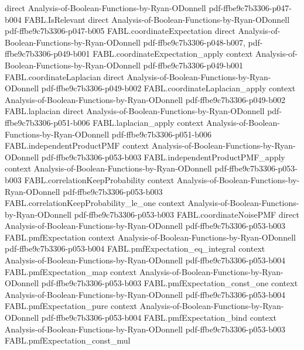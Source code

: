 \begin{theorem}
  {direct}
  {Analysis-of-Boolean-Functions-by-Ryan-ODonnell}
  {pdf-ffbe9c7b3306-p047-b004}
\proofstep
  {FABL.IsRelevant}
  {direct}
  {Analysis-of-Boolean-Functions-by-Ryan-ODonnell}
  {pdf-ffbe9c7b3306-p047-b005}
\proofstep
  {FABL.coordinateExpectation}
  {direct}
  {Analysis-of-Boolean-Functions-by-Ryan-ODonnell}
  {pdf-ffbe9c7b3306-p048-b007,
    pdf-ffbe9c7b3306-p049-b001}
\proofstep
  {FABL.coordinateExpectation_apply}
  {context}
  {Analysis-of-Boolean-Functions-by-Ryan-ODonnell}
  {pdf-ffbe9c7b3306-p049-b001}
\proofstep
  {FABL.coordinateLaplacian}
  {direct}
  {Analysis-of-Boolean-Functions-by-Ryan-ODonnell}
  {pdf-ffbe9c7b3306-p049-b002}
\proofstep
  {FABL.coordinateLaplacian_apply}
  {context}
  {Analysis-of-Boolean-Functions-by-Ryan-ODonnell}
  {pdf-ffbe9c7b3306-p049-b002}
\proofstep
  {FABL.laplacian}
  {direct}
  {Analysis-of-Boolean-Functions-by-Ryan-ODonnell}
  {pdf-ffbe9c7b3306-p051-b006}
\proofstep
  {FABL.laplacian_apply}
  {context}
  {Analysis-of-Boolean-Functions-by-Ryan-ODonnell}
  {pdf-ffbe9c7b3306-p051-b006}
\proofstep
  {FABL.independentProductPMF}
  {context}
  {Analysis-of-Boolean-Functions-by-Ryan-ODonnell}
  {pdf-ffbe9c7b3306-p053-b003}
\proofstep
  {FABL.independentProductPMF_apply}
  {context}
  {Analysis-of-Boolean-Functions-by-Ryan-ODonnell}
  {pdf-ffbe9c7b3306-p053-b003}
\proofstep
  {FABL.correlationKeepProbability}
  {context}
  {Analysis-of-Boolean-Functions-by-Ryan-ODonnell}
  {pdf-ffbe9c7b3306-p053-b003}
\proofstep
  {FABL.correlationKeepProbability_le_one}
  {context}
  {Analysis-of-Boolean-Functions-by-Ryan-ODonnell}
  {pdf-ffbe9c7b3306-p053-b003}
\proofstep
  {FABL.coordinateNoisePMF}
  {direct}
  {Analysis-of-Boolean-Functions-by-Ryan-ODonnell}
  {pdf-ffbe9c7b3306-p053-b003}
\proofstep
  {FABL.pmfExpectation}
  {context}
  {Analysis-of-Boolean-Functions-by-Ryan-ODonnell}
  {pdf-ffbe9c7b3306-p053-b004}
\proofstep
  {FABL.pmfExpectation_eq_integral}
  {context}
  {Analysis-of-Boolean-Functions-by-Ryan-ODonnell}
  {pdf-ffbe9c7b3306-p053-b004}
\proofstep
  {FABL.pmfExpectation_map}
  {context}
  {Analysis-of-Boolean-Functions-by-Ryan-ODonnell}
  {pdf-ffbe9c7b3306-p053-b003}
\proofstep
  {FABL.pmfExpectation_const_one}
  {context}
  {Analysis-of-Boolean-Functions-by-Ryan-ODonnell}
  {pdf-ffbe9c7b3306-p053-b004}
\proofstep
  {FABL.pmfExpectation_pure}
  {context}
  {Analysis-of-Boolean-Functions-by-Ryan-ODonnell}
  {pdf-ffbe9c7b3306-p053-b004}
\proofstep
  {FABL.pmfExpectation_bind}
  {context}
  {Analysis-of-Boolean-Functions-by-Ryan-ODonnell}
  {pdf-ffbe9c7b3306-p053-b003}
\proofstep
  {FABL.pmfExpectation_const_mul}

\end{theorem}
